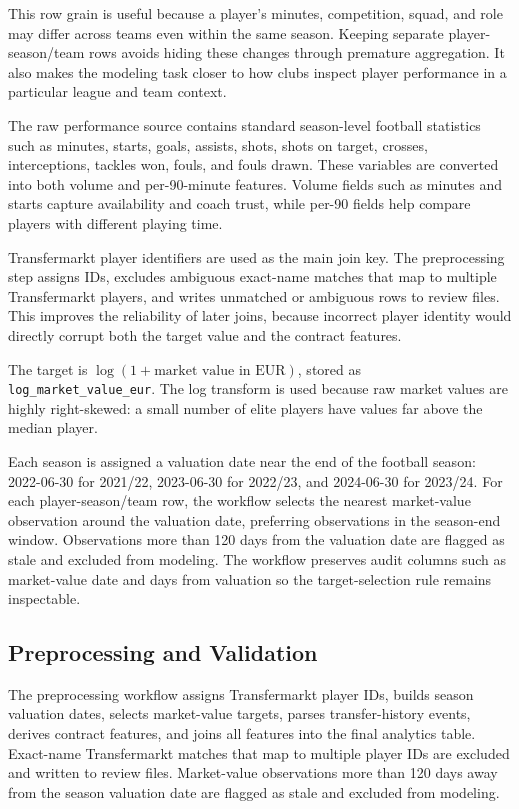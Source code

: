\documentclass[conference]{IEEEtran}
\begin{document}
This row grain is useful because a player's minutes, competition, squad, and role may differ across teams even within the same season. Keeping separate player-season/team rows avoids hiding these changes through premature aggregation. It also makes the modeling task closer to how clubs inspect player performance in a particular league and team context.

The raw performance source contains standard season-level football statistics such as minutes, starts, goals, assists, shots, shots on target, crosses, interceptions, tackles won, fouls, and fouls drawn. These variables are converted into both volume and per-90-minute features. Volume fields such as minutes and starts capture availability and coach trust, while per-90 fields help compare players with different playing time.

Transfermarkt player identifiers are used as the main join key. The preprocessing step assigns IDs, excludes ambiguous exact-name matches that map to multiple Transfermarkt players, and writes unmatched or ambiguous rows to review files. This improves the reliability of later joins, because incorrect player identity would directly corrupt both the target value and the contract features.

The target is \(\log(1 + \text{market value in EUR})\), stored as \texttt{log\_market\_value\_eur}. The log transform is used because raw market values are highly right-skewed: a small number of elite players have values far above the median player.

Each season is assigned a valuation date near the end of the football season: 2022-06-30 for 2021/22, 2023-06-30 for 2022/23, and 2024-06-30 for 2023/24. For each player-season/team row, the workflow selects the nearest market-value observation around the valuation date, preferring observations in the season-end window. Observations more than 120 days from the valuation date are flagged as stale and excluded from modeling. The workflow preserves audit columns such as market-value date and days from valuation so the target-selection rule remains inspectable.

\subsection{Preprocessing and Validation}
The preprocessing workflow assigns Transfermarkt player IDs, builds season valuation dates, selects market-value targets, parses transfer-history events, derives contract features, and joins all features into the final analytics table. Exact-name Transfermarkt matches that map to multiple player IDs are excluded and written to review files. Market-value observations more than 120 days away from the season valuation date are flagged as stale and excluded from modeling.
\end{document}
